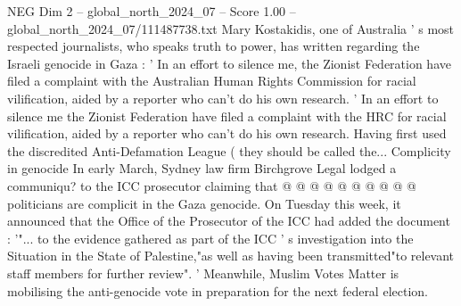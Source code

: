 \begin{textsample}{NEG Dim 2 – global\_north\_2024\_07 – Score 1.00 – global\_north\_2024\_07/111487738.txt}
Mary Kostakidis, one of Australia ' s most respected journalists, who speaks truth to power, has written regarding the Israeli genocide in Gaza : ' In an effort to silence me, the Zionist Federation have filed a complaint with the Australian Human Rights Commission for racial vilification, aided by a reporter who can't do his own research. ' In an effort to silence me the Zionist Federation have filed a complaint with the HRC for racial vilification, aided by a reporter who can't do his own research.
Having first used the discredited Anti-Defamation League ( they should be called the...
Complicity in genocide In early March, Sydney law firm Birchgrove Legal lodged a communiqu? to the ICC prosecutor claiming that @ @ @ @ @ @ @ @ @ @ politicians are complicit in the Gaza genocide.
On Tuesday this week, it announced that the Office of the Prosecutor of the ICC had added the document : '"... to the evidence gathered as part of the ICC ' s investigation into the Situation in the State of Palestine,"as well as having been transmitted"to relevant staff members for further review". ' Meanwhile, Muslim Votes Matter is mobilising the anti-genocide vote in preparation for the next federal election.

\end{textsample}
